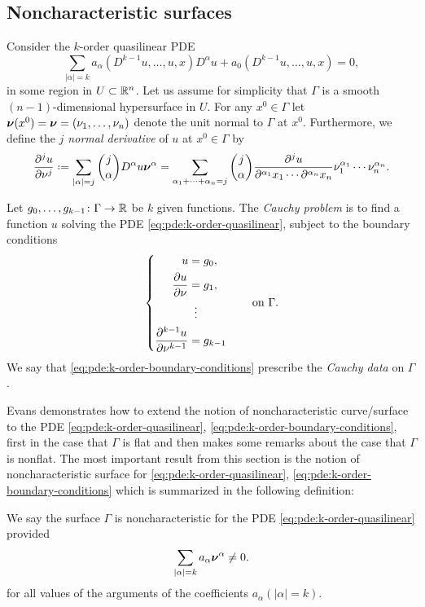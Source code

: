 \subsection{Noncharacteristic surfaces}
Consider the \(k\)-order quasilinear PDE
\begin{equation}
  \label{eq:pde:k-order-quasilinear}
  \sum_{|\alpha|=k}a_\alpha(D^{k-1}u,\dotsc,u,x)D^\alpha
  u+a_0(D^{k-1}u,\dotsc,u,x)=0,
\end{equation}
in some region in \(U\subset\mathbb{R}^n\). Let us assume for simplicity that
\(\Gamma\) is a smooth \((n-1)\)-dimensional hypersurface in \(U\). For any
\(x^0\in\Gamma\) let \({\boldsymbol\nu}(x^0)={\boldsymbol\nu}=(\nu_1,\dotsc,\nu_n)\) denote the
unit normal to \(\Gamma\) at \(x^0\). Furthermore, we define the
\emph{\(j\) normal derivative} of \(u\) at \(x^0\in\Gamma\) by
\[
  \frac{\partial^j u}{\partial\nu^j}
  \defeq\sum_{|\alpha|=j}\binom{j}{\alpha}D^\alpha u\bfnu^\alpha
  =\sum_{\alpha_1+\dotsb+\alpha_n=j}\binom{j}{\alpha}
  \frac{\partial^j u}{\partial^{\alpha_1}x_1\dotsm\partial^{\alpha_n}x_n}
  \nu_1^{\alpha_1}\dotsm\nu_n^{\alpha_n}.
\]

Let \(g_0,\dotsc,g_{k-1}\colon\Gamma\to\mathbb{R}\) be \(k\) given functions. The
\emph{Cauchy problem} is to find a function \(u\) solving the PDE
\eqref{eq:pde:k-order-quasilinear}, subject to the boundary conditions
\begin{equation}
  \label{eq:pde:k-order-boundary-conditions}
  \left\{
    \begin{aligned}
      u&=g_0,\\
      \frac{\partial u}{\partial\nu}
      &=g_1,\\
      &\vdotswithin{=}\\
      \frac{\partial^{k-1} u}{\partial\nu^{k-1}} &=g_{k-1}
    \end{aligned}
  \right.
  \qquad\text{on \(\Gamma\).}
\end{equation}
We say that \eqref{eq:pde:k-order-boundary-conditions} prescribe the
\emph{Cauchy data} on \(\Gamma\).

Evans demonstrates how to extend the notion of noncharacteristic
curve/surface to the PDE \eqref{eq:pde:k-order-quasilinear},
\eqref{eq:pde:k-order-boundary-conditions}, first in the case that
\(\Gamma\) is flat and then makes some remarks about the case that
\(\Gamma\) is nonflat. The most important result from this section is the
notion of noncharacteristic surface for \eqref{eq:pde:k-order-quasilinear},
\eqref{eq:pde:k-order-boundary-conditions} which is summarized in the
following definition:
\begin{definition}
  We say the surface \(\Gamma\) is noncharacteristic for the PDE
  \eqref{eq:pde:k-order-quasilinear} provided
\begin{equation}
  \label{eq:pde:k-order-noncharacteristic}
  \sum_{|\alpha|=k}a_\alpha{\boldsymbol\nu}^\alpha\neq 0.
\end{equation}
for all values of the arguments of the coefficients
\(a_\alpha(|\alpha|=k)\).
\end{definition}

